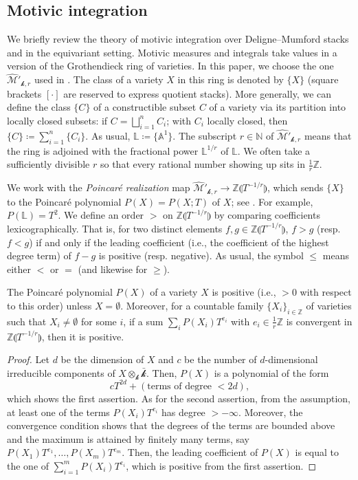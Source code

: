 \documentclass[12pt]{amsart}
\theoremstyle{plain}   %
\theoremstyle{definition}    %
\theoremstyle{remark}    %
\numberwithin{equation}{theorem}
\newcommand{\kay}{\mathcal{k}}
\newcommand{\sM}{\mathcal{M}}
\newcommand{\bA}{\mathbb{A}}
\newcommand{\bL}{\mathbb{L}}
\newcommand{\bN}{\mathbb{N}}
\newcommand{\bZ}{\mathbb{Z}}
\begin{document}
\subsection{Motivic integration}
We briefly review the theory of motivic integration over Deligne--Mumford stacks and in the equivariant setting. Motivic measures and integrals take values in a version of the Grothendieck ring of varieties. In this paper, we choose the one $\hat{\sM}'_{\kay,r}$ used in \cite{YasudaMotivicIntegrationDeligneMumfordStack}. The class of a variety $X$ in this ring is denoted by $\{X\}$ (square brackets $[\cdot]$ are reserved to express quotient stacks).
More generally, we can define the class $\{C\}$ of a constructible subset $C$ of a variety via its partition into locally closed subsets: if $C=\bigsqcup_{i=1}^nC_i$; with $C_i$ locally closed, then $\{C\}\coloneqq\sum_{i=1}^n\{C_i\}$. As usual, $\bL\coloneqq\{\bA^1\}$. The subscript $r \in \bN$ of $\hat{\sM}'_{\kay,r}$ means that the ring is adjoined with the fractional power $\bL^{1/r}$ of $\bL$. We often take a sufficiently divisible $r$ so that every rational number showing up sits in $\frac{1}{r}\bZ$. 

We work with the \emph{Poincar\'e realization} map $\hat{\sM}'_{\kay,r} \to \bZ\llparenthesis T^{-1/r}\rrparenthesis$, which sends $\{X\}$ to the Poincar\'e polynomial $ P(X)=P(X;T)$ of $X$; see \cite[\S8]{NicaiseTraceFormulaForVarietesOverADVF}. For example, $P(\bL)=T^2$. We define an order $>$ on $\bZ \llparenthesis T^{-1/r} \rrparenthesis$ by comparing coefficients lexicographically. That is, for two distinct elements $f,g\in \bZ \llparenthesis T^{-1/r} \rrparenthesis$, $f>g$ (resp. $f<g$) if and only if the leading coefficient (i.e., the coefficient of the highest degree term) of $f-g$ is positive (resp. negative). As usual, the
symbol $\le$ means either $<$ or $=$ (and likewise for $\ge$). 

\begin{proposition}\label{positive}
The Poincaré polynomial $P(X)$ of a variety $X$ is positive (i.e., $>0$ with respect to this
order) unless $X = \emptyset$. Moreover, for a countable family $\{X_i\}_{i \in \bZ}$ of varieties such that $X_i \ne \emptyset$ for some $i$, if a sum
$\sum_{i}P(X_{i})T^{e_{i}}$ with $e_{i}\in\frac{1}{r}\bZ$ is convergent in $\bZ \llparenthesis T^{-1/r} \rrparenthesis$, then it is positive.
\end{proposition}

\begin{proof}
Let $d$ be the dimension of $X$ and $c$ be the number of $d$-dimensional irreducible components of $X\otimes_{\kay} \bar{\kay}$. Then, $P(X)$ is a polynomial  of the form
\[
 c T^{2d} + (\text{terms of degree $<2d$}), 
\]
which shows the first assertion. 
As for the second assertion, from the assumption, at least one of the terms $P(X_i)T^{e_i}$ has degree $>-\infty$. Moreover, the convergence condition shows that the degrees of the terms are bounded above and the maximum is attained by finitely many terms, say $P(X_1)T^{e_1}, \dots, P(X_m)T^{e_m}$. 
Then, the leading coefficient of $P(X)$ is equal to the one of  $\sum_{i=1}^m P(X_i)T^{e_i}$, which is positive from the first assertion.
\end{proof}
\end{document}
